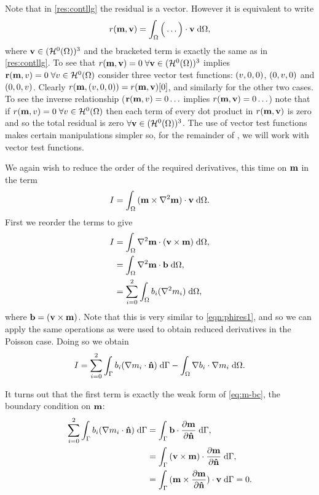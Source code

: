 Note that in \cref{res:contllg} the residual is a vector.
However it is equivalent to write
\begin{equation}
  r(\mathbf{m}, \mathbf{v}) = \int_\Omega \Big( \ldots  \Big) \cdot \mathbf{v} {\; \mathrm{{d}}}\Omega,
\end{equation}
where $\mathbf{v} \in (\mathcal{H}^0(\Omega))^3$ and the bracketed term is exactly the same as in \cref{res:contllg}.
To see that $r(\mathbf{m}, \mathbf{v}) = 0\; \forall \mathbf{v} \in (\mathcal{H}^0(\Omega))^3$ implies $\mathbf{r}(\mathbf{m}, v) = 0 \; \forall v \in \mathcal{H}^0(\Omega)$ consider three vector test functions: $(v, 0, 0)$, $(0, v, 0)$ and $(0, 0, v)$.
Clearly $r(\mathbf{m}, (v, 0, 0)) = r(\mathbf{m}, \mathbf{v})[0]$, and similarly for the other two cases.
To see the inverse relationship (\ie $\mathbf{r}(\mathbf{m}, v) = 0 \ldots$ implies $r(\mathbf{m}, \mathbf{v}) = 0 \ldots$) note that if $r(\mathbf{m}, v) = 0\; \forall v \in \mathcal{H}^0(\Omega)$ then each term of every dot product in $r(\mathbf{m}, \mathbf{v})$ is zero and so the total residual is zero $\forall \mathbf{v} \in (\mathcal{H}^0(\Omega))^3$.
The use of vector test functions makes certain manipulations simpler so, for the remainder of , we will work with vector test functions.

We again wish to reduce the order of the required derivatives, this time on $\mathbf{m}$ in the term
\begin{equation}
  I = {\int_{\Omega} { (\mathbf{m} \times \nabla^2 \mathbf{m}) \cdot \mathbf{v} } {\; \mathrm{{d}}} {\Omega}}.
  \label{eq:46}
\end{equation}
First we reorder the terms to give
\begin{equation}
  \begin{aligned}
    I &= {\int_{\Omega} {\nabla^2 \mathbf{m} \cdot (\mathbf{v} \times \mathbf{m})} {\; \mathrm{{d}}} {\Omega}}, \\
      &= {\int_{\Omega} {\nabla^2 \mathbf{m} \cdot {\mathbf{b}}} {\; \mathrm{{d}}} {\Omega}}, \\
      &= \sum_{i=0}^2 {\int_{\Omega} { b_i (\nabla^2 m_i)} {\; \mathrm{{d}}} {\Omega}},
  \end{aligned}
\end{equation}
where ${\mathbf{b}} = (\mathbf{v} \times \mathbf{m})$.
Note that this is very similar to \cref{eqn:phires1}, and so we can apply the same operations as were used to obtain reduced derivatives in the Poisson case. 
Doing so we obtain
\begin{equation}
  I = \sum_{i=0}^2 {\int_{{\Gamma}} {b_i (\nabla m_i \cdot \mathbf{\hat{n}})} {\; \mathrm{{d}}} {{\Gamma}}} - {\int_{\Omega} {\nabla b_i \cdot \nabla m_i} {\; \mathrm{{d}}} {\Omega}}.
\end{equation}

It turns out that the first term is exactly the weak form of \cref{eq:m-bc}, the boundary condition on $\mathbf{m}$:
\begin{equation}
  \begin{aligned}
    \sum_{i=0}^2 {\int_{{\Gamma}} {b_i (\nabla m_i \cdot \mathbf{\hat{n}})} {\; \mathrm{{d}}} {{\Gamma}}} 
    &= {\int_{{\Gamma}} {{\mathbf{b}} \cdot \frac{\partial \mathbf{m}}{\partial \mathbf{\hat{n}}}} {\; \mathrm{{d}}} {{\Gamma}}}, \\
    &=  {\int_{{\Gamma}} {(\mathbf{v} \times \mathbf{m}) \cdot \frac{\partial \mathbf{m}}{\partial \mathbf{\hat{n}}}} {\; \mathrm{{d}}} {{\Gamma}}}, \\
    &=  {\int_{{\Gamma}} {(\mathbf{m} \times \frac{\partial \mathbf{m}}{\partial \mathbf{\hat{n}}}) \cdot \mathbf{v}} {\; \mathrm{{d}}} {{\Gamma}}} = 0 .
  \end{aligned}
\end{equation}

